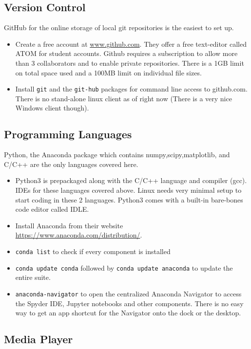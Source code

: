 \documentclass[8pt,letterpaper,twocolumn]{article}
\begin{document}
\subsection{Version Control}

GitHub for the online storage of local git repositories is the easiest to set up.

\begin{itemize}
	\item Create a free account at \url{www.github.com}. They offer a free text-editor called ATOM for student accounts. Github requires a subscription to allow more than 3 collaborators and to enable private repositories. There is a 1GB limit on total space used and a 100MB limit on individual file sizes.
	\item Install \texttt{git} and the \texttt{git-hub} packages for command line access to github.com. There is no stand-alone linux client as of right now (There is a very nice Windows client though).
\end{itemize}

\subsection{Programming Languages}
Python, the Anaconda package which contains numpy,scipy,matplotlib, and C/C++ are the only languages covered here.

\begin{itemize}
	\item Python3 is prepackaged along with the C/C++ language and compiler (gcc). IDEs for these languages covered above. Linux needs very minimal setup to start coding in these 2 languages. Python3 comes with a built-in bare-bones code editor called IDLE. 
	\item Install Anaconda from their website \\ \url{https://www.anaconda.com/distribution/}. 
	\item \texttt{conda list} to check if every component is installed
	\item \texttt{conda update conda} followed by \texttt{conda update anaconda} to update the entire suite.
	\item \texttt{anaconda-navigator} to open the centralized Anaconda Navigator to access the Spyder IDE, Jupyter notebooks and other components. There is no easy way to get an app shortcut for the Navigator onto the dock or the desktop.
\end{itemize}

\subsection{Media Player}
\end{document}
